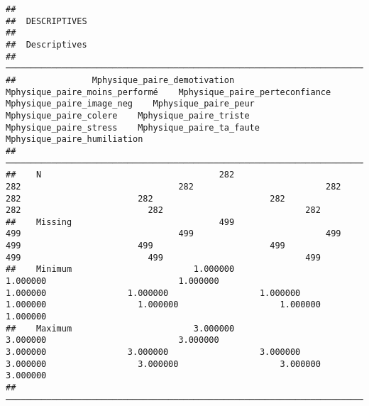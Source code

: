\documentclass[
]{article}
\begin{document}
\begin{verbatim}
## 
##  DESCRIPTIVES
## 
##  Descriptives                                                                                                                                                                                                                                                                                                  
##  ───────────────────────────────────────────────────────────────────────────────────────────────────────────────────────────────────────────────────────────────────────────────────────────────────────────────────────────────────────────────────────────────────────────────────────────────────────────── 
##               Mphysique_paire_demotivation    Mphysique_paire_moins_performé    Mphysique_paire_perteconfiance    Mphysique_paire_image_neg    Mphysique_paire_peur    Mphysique_paire_colere    Mphysique_paire_triste    Mphysique_paire_stress    Mphysique_paire_ta_faute    Mphysique_paire_humiliation   
##  ───────────────────────────────────────────────────────────────────────────────────────────────────────────────────────────────────────────────────────────────────────────────────────────────────────────────────────────────────────────────────────────────────────────────────────────────────────────── 
##    N                                   282                               282                               282                          282                     282                       282                       282                       282                         282                            282   
##    Missing                             499                               499                               499                          499                     499                       499                       499                       499                         499                            499   
##    Minimum                        1.000000                          1.000000                          1.000000                     1.000000                1.000000                  1.000000                  1.000000                  1.000000                    1.000000                       1.000000   
##    Maximum                        3.000000                          3.000000                          3.000000                     3.000000                3.000000                  3.000000                  3.000000                  3.000000                    3.000000                       3.000000   
##  ─────────────────────────────────────────────────────────────────────────────────────────────────────────────────────────────────────────────────────────────────────────────────────────────────────────────────────────────────────────────────────────────────────────────────────────────────────────────
\end{verbatim}
\end{document}
